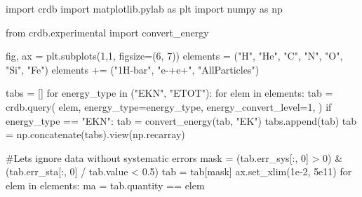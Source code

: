 \documentclass[
  letterpaper,
  DIV=11,
  numbers=noendperiod]{scrreprt}
\newenvironment{Shaded}{\begin{snugshade}}{\end{snugshade}}
\newcommand{\CommentTok}[1]{\textcolor[rgb]{0.37,0.37,0.37}{#1}}
\newcommand{\ControlFlowTok}[1]{\textcolor[rgb]{0.00,0.23,0.31}{#1}}
\newcommand{\DecValTok}[1]{\textcolor[rgb]{0.68,0.00,0.00}{#1}}
\newcommand{\FloatTok}[1]{\textcolor[rgb]{0.68,0.00,0.00}{#1}}
\newcommand{\ImportTok}[1]{\textcolor[rgb]{0.00,0.46,0.62}{#1}}
\newcommand{\KeywordTok}[1]{\textcolor[rgb]{0.00,0.23,0.31}{#1}}
\newcommand{\NormalTok}[1]{\textcolor[rgb]{0.00,0.23,0.31}{#1}}
\newcommand{\OperatorTok}[1]{\textcolor[rgb]{0.37,0.37,0.37}{#1}}
\newcommand{\StringTok}[1]{\textcolor[rgb]{0.13,0.47,0.30}{#1}}
\begin{document}
\begin{Shaded}
\begin{Highlighting}[]
\ImportTok{import}\NormalTok{ crdb}
\ImportTok{import}\NormalTok{ matplotlib.pylab }\ImportTok{as}\NormalTok{ plt}
\ImportTok{import}\NormalTok{ numpy }\ImportTok{as}\NormalTok{ np}

\ImportTok{from}\NormalTok{ crdb.experimental }\ImportTok{import}\NormalTok{ convert\_energy}

\NormalTok{fig, ax }\OperatorTok{=}\NormalTok{ plt.subplots(}\DecValTok{1}\NormalTok{,}\DecValTok{1}\NormalTok{, figsize}\OperatorTok{=}\NormalTok{(}\DecValTok{6}\NormalTok{, }\DecValTok{7}\NormalTok{))}
\NormalTok{elements }\OperatorTok{=}\NormalTok{ (}\StringTok{"H"}\NormalTok{, }\StringTok{"He"}\NormalTok{, }\StringTok{"C"}\NormalTok{, }\StringTok{"N"}\NormalTok{, }\StringTok{"O"}\NormalTok{, }\StringTok{"Si"}\NormalTok{, }\StringTok{"Fe"}\NormalTok{)}
\NormalTok{elements }\OperatorTok{+=}\NormalTok{ (}\StringTok{"1H{-}bar"}\NormalTok{, }\StringTok{"e{-}+e+"}\NormalTok{, }\StringTok{"AllParticles"}\NormalTok{)}

\NormalTok{tabs }\OperatorTok{=}\NormalTok{ []}
\ControlFlowTok{for}\NormalTok{ energy\_type }\KeywordTok{in}\NormalTok{ (}\StringTok{"EKN"}\NormalTok{, }\StringTok{"ETOT"}\NormalTok{):}
    \ControlFlowTok{for}\NormalTok{ elem }\KeywordTok{in}\NormalTok{ elements:}
\NormalTok{        tab }\OperatorTok{=}\NormalTok{ crdb.query(}
\NormalTok{            elem,}
\NormalTok{            energy\_type}\OperatorTok{=}\NormalTok{energy\_type,}
\NormalTok{            energy\_convert\_level}\OperatorTok{=}\DecValTok{1}\NormalTok{,}
\NormalTok{        )}
        \ControlFlowTok{if}\NormalTok{ energy\_type }\OperatorTok{==} \StringTok{"EKN"}\NormalTok{:}
\NormalTok{            tab }\OperatorTok{=}\NormalTok{ convert\_energy(tab, }\StringTok{"EK"}\NormalTok{)}
\NormalTok{        tabs.append(tab)}
\NormalTok{tab }\OperatorTok{=}\NormalTok{ np.concatenate(tabs).view(np.recarray)}

\CommentTok{\#Lets ignore data without systematic errors}
\NormalTok{mask }\OperatorTok{=}\NormalTok{ (tab.err\_sys[:, }\DecValTok{0}\NormalTok{] }\OperatorTok{\textgreater{}} \DecValTok{0}\NormalTok{) }\OperatorTok{\&}\NormalTok{ (tab.err\_sta[:, }\DecValTok{0}\NormalTok{] }\OperatorTok{/}\NormalTok{ tab.value }\OperatorTok{\textless{}} \FloatTok{0.5}\NormalTok{)}
\NormalTok{tab }\OperatorTok{=}\NormalTok{ tab[mask]}
\NormalTok{ax.set\_xlim(}\FloatTok{1e{-}2}\NormalTok{, }\FloatTok{5e11}\NormalTok{)}
\ControlFlowTok{for}\NormalTok{ elem }\KeywordTok{in}\NormalTok{ elements:}
\NormalTok{    ma }\OperatorTok{=}\NormalTok{ tab.quantity }\OperatorTok{==}\NormalTok{ elem}


\end{Highlighting}
\end{Shaded}
\end{document}
